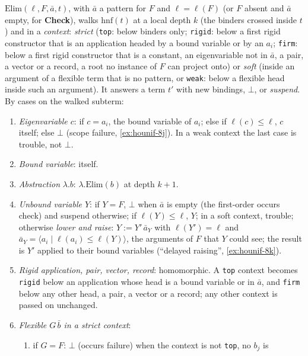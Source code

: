 \begin{definition}\label{def:module-elim}
$\mathrm{Elim}(\ell, F, \bar a, t)$, with $\bar a$ a pattern for $F$ and $\ell=\ell(F)$ (or $F$ absent and
$\bar a$ empty, for \textbf{Check}), walks $\mathrm{hnf}(t)$ at a local depth $k$ (the binders crossed inside
$t$) and in a \emph{context}: \emph{strict} (\texttt{top}: below binders only; \texttt{rigid}: below a first rigid
constructor that is an application headed by a bound variable or by an $a_i$; \texttt{firm}: below a first rigid
constructor that is a constant, an eigenvariable not in $\bar a$, a pair, a vector or a record, a root no instance
of $F$ can project onto) or \emph{soft} (inside an argument of a flexible term that is no pattern, or
\texttt{weak}: below a flexible head inside such an argument). It answers a term $t'$ with new bindings,
$\bot$, or \emph{suspend}. By cases on the walked subterm:
\begin{enumerate}[label=(\arabic*)]
  \item \emph{Eigenvariable $c$}: if $c = a_i$, the bound variable of $a_i$; else if $\ell(c)\le\ell$, $c$
    itself; else $\bot$ (scope failure, \cref{ex:hounif-8j}). In a weak context the last case is trouble, not
    $\bot$.
  \item \emph{Bound variable}: itself.
  \item \emph{Abstraction} $\lambda.b$: $\lambda.\mathrm{Elim}(b)$ at depth $k+1$.
  \item \emph{Unbound variable $Y$}: if $Y=F$, $\bot$ when $\bar a$ is empty (the first-order occurs check) and
    suspend otherwise; if $\ell(Y)\le\ell$, $Y$; in a soft context, trouble; otherwise \emph{lower and raise}:
    $Y := Y'\,\bar a_Y$ with $\ell(Y')=\ell$ and $\bar a_Y = \langle a_i \mid \ell(a_i)\le\ell(Y)\rangle$, the
    arguments of $F$ that $Y$ could see; the result is $Y'$ applied to their bound variables
    (\enquote{delayed raising}, \cref{ex:hounif-8k}).
  \item \emph{Rigid application, pair, vector, record}: homomorphic. A \texttt{top} context becomes
    \texttt{rigid} below an application whose head is a bound variable or in $\bar a$, and \texttt{firm} below
    any other head, a pair, a vector or a record; any other context is passed on unchanged.
  \item \emph{Flexible $G\,\bar b$ in a strict context}:
    \begin{enumerate}[label=(\alph*)]
      \item if $G=F$: $\bot$ (occurs failure) when the context is not \texttt{top}, no $b_j$ is

\end{enumerate}
\end{enumerate}
\end{definition}

